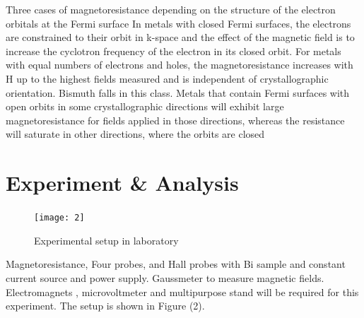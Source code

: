 \documentclass[a4paper, amsfonts, amssymb, amsmath, reprint, showkeys, nofootinbib, twoside]{revtex4-1}
\begin{document}
Three cases of magnetoresistance depending on the structure of the electron orbitals at the Fermi surface In metals with closed Fermi surfaces, the electrons are constrained to their orbit in k-space and the effect of the magnetic field is to increase the cyclotron frequency of the electron in its closed orbit. For metals with equal numbers of electrons and holes, the magnetoresistance increases with
H up to the highest fields measured and is independent of crystallographic orientation. Bismuth falls in this class. Metals that contain Fermi surfaces with open orbits in some crystallographic directions will exhibit large magnetoresistance for fields applied in those directions, whereas the resistance will saturate in other directions, where the orbits are closed

\section{Experiment \& Analysis}
\begin{figure}[H]
	\centering
	\texttt{[image: 2]} 
	\caption{Experimental setup in laboratory}
	\label{2}
\end{figure}
Magnetoresistance, Four probes, and Hall probes with Bi sample and constant current source and power supply. Gaussmeter to measure magnetic fields. Electromagnets , microvoltmeter and multipurpose stand will be required for this experiment. The setup is shown in Figure (2).
\end{document}
